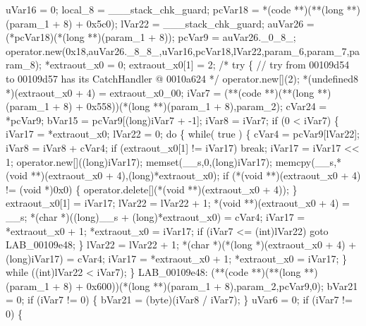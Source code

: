 \documentclass[
]{article}
\newenvironment{Shaded}{}{}
\newcommand{\NormalTok}[1]{#1}
\begin{document}
\begin{Shaded}
\begin{Highlighting}[]
\NormalTok{  uVar16 = 0;}
\NormalTok{  local\_8 = \_\_\_stack\_chk\_guard;}
\NormalTok{  pcVar18 = *(code **)(**(long **)(param\_1 + 8) + 0x5c0);}
\NormalTok{  lVar22 = \_\_\_stack\_chk\_guard;}
\NormalTok{  auVar26 = (*pcVar18)(*(long **)(param\_1 + 8));}
\NormalTok{  pcVar9 = auVar26.\_0\_8\_;}
\NormalTok{  operator.new(0x18,auVar26.\_8\_8\_,uVar16,pcVar18,lVar22,param\_6,param\_7,param\_8);}
\NormalTok{  *extraout\_x0 = 0;}
\NormalTok{  extraout\_x0[1] = 2;}
\NormalTok{                    /* try \{ // try from 00109d54 to 00109d57 has its CatchHandler @ 0010a624 */}
\NormalTok{  operator.new[](2);}
\NormalTok{  *(undefined8 *)(extraout\_x0 + 4) = extraout\_x0\_00;}
\NormalTok{  iVar7 = (**(code **)(**(long **)(param\_1 + 8) + 0x558))(*(long **)(param\_1 + 8),param\_2);}
\NormalTok{  cVar24 = *pcVar9;}
\NormalTok{  bVar15 = pcVar9[(long)iVar7 + {-}1];}
\NormalTok{  iVar8 = iVar7;}
\NormalTok{  if (0 \textless{} iVar7) \{}
\NormalTok{    iVar17 = *extraout\_x0;}
\NormalTok{    lVar22 = 0;}
\NormalTok{    do \{}
\NormalTok{      while( true ) \{}
\NormalTok{        cVar4 = pcVar9[lVar22];}
\NormalTok{        iVar8 = iVar8 + cVar4;}
\NormalTok{        if (extraout\_x0[1] != iVar17) break;}
\NormalTok{        iVar17 = iVar17 \textless{}\textless{} 1;}
\NormalTok{        operator.new[]((long)iVar17);}
\NormalTok{        memset(\_\_s,0,(long)iVar17);}
\NormalTok{        memcpy(\_\_s,*(void **)(extraout\_x0 + 4),(long)*extraout\_x0);}
\NormalTok{        if (*(void **)(extraout\_x0 + 4) != (void *)0x0) \{}
\NormalTok{          operator.delete[](*(void **)(extraout\_x0 + 4));}
\NormalTok{        \}}
\NormalTok{        extraout\_x0[1] = iVar17;}
\NormalTok{        lVar22 = lVar22 + 1;}
\NormalTok{        *(void **)(extraout\_x0 + 4) = \_\_s;}
\NormalTok{        *(char *)((long)\_\_s + (long)*extraout\_x0) = cVar4;}
\NormalTok{        iVar17 = *extraout\_x0 + 1;}
\NormalTok{        *extraout\_x0 = iVar17;}
\NormalTok{        if (iVar7 \textless{}= (int)lVar22) goto LAB\_00109e48;}
\NormalTok{      \}}
\NormalTok{      lVar22 = lVar22 + 1;}
\NormalTok{      *(char *)(*(long *)(extraout\_x0 + 4) + (long)iVar17) = cVar4;}
\NormalTok{      iVar17 = *extraout\_x0 + 1;}
\NormalTok{      *extraout\_x0 = iVar17;}
\NormalTok{    \} while ((int)lVar22 \textless{} iVar7);}
\NormalTok{  \}}
\NormalTok{LAB\_00109e48:}
\NormalTok{  (**(code **)(**(long **)(param\_1 + 8) + 0x600))(*(long **)(param\_1 + 8),param\_2,pcVar9,0);}
\NormalTok{  bVar21 = 0;}
\NormalTok{  if (iVar7 != 0) \{}
\NormalTok{    bVar21 = (byte)(iVar8 / iVar7);}
\NormalTok{  \}}
\NormalTok{  uVar6 = 0;}
\NormalTok{  if (iVar7 != 0) \{}

\end{Highlighting}
\end{Shaded}
\end{document}
